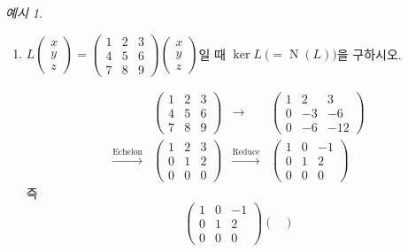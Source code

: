 \documentclass[unfonts,oneside,a4paper]{oblivoir}
\theoremstyle{definition}
\theoremstyle{theorem}
\theoremstyle{theorem}
\theoremstyle{remark}
\theoremstyle{remark}
\theoremstyle{remark}
\newtheorem*{example}{예시}
\theoremstyle{remark}
\DeclareMathOperator{\Null}{N}
\begin{document}
\begin{example}
    \leavevmode
    \begin{enumerate}
        \item $L \begin{pmatrix}x \\ y \\ z\end{pmatrix} = \begin{pmatrix}1 & 2 & 3 \\ 4 & 5 & 6 \\ 7 & 8 & 9\end{pmatrix} \begin{pmatrix}x \\ y \\ z\end{pmatrix}$일 때 $\ker L\ \bigl(= \Null (L)\bigr)$을 구하시오.
            \begin{solution}
                \begin{align*}
                    &\begin{pmatrix}
                    1 & 2 & 3 \\ 4 & 5 & 6 \\ 7 & 8 & 9
                    \end{pmatrix}&\rightarrow &\begin{pmatrix}
                    1 & 2 & 3 \\ 0 & -3 & -6 \\ 0 & -6 & -12
                \end{pmatrix}\\
                \xrightarrow{\text{Echelon}} &\begin{pmatrix}
                    1 & 2 & 3 \\ 0 & 1 & 2 \\ 0 & 0 & 0
                    \end{pmatrix}&\xrightarrow{\text{Reduce}} &\begin{pmatrix}
                    1 & 0 & -1 \\ 0 & 1 & 2 \\ 0 & 0 & 0
                \end{pmatrix}
            \end{align*}
            즉
            \begin{equation*}
                \begin{pmatrix}
                    1 & 0 & -1 \\ 0 & 1 & 2 \\ 0 & 0 & 0
                    \end{pmatrix} \begin{pmatrix}

\end{pmatrix}
\end{equation*}
\end{solution}
\end{enumerate}
\end{example}
\end{document}
